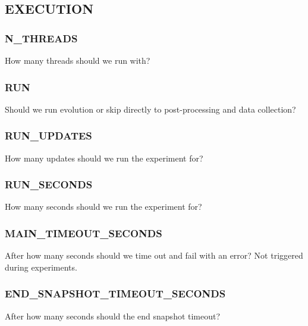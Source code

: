 \subsection{EXECUTION}


\subsubsection{N\_THREADS}


How many threads should we run with?

\subsubsection{RUN}


Should we run evolution or skip directly to post-processing and data collection?

\subsubsection{RUN\_UPDATES}


How many updates should we run the experiment for?

\subsubsection{RUN\_SECONDS}


How many seconds should we run the experiment for?

\subsubsection{MAIN\_TIMEOUT\_SECONDS}


After how many seconds should we time out and fail with an error?
Not triggered during experiments.

\subsubsection{END\_SNAPSHOT\_TIMEOUT\_SECONDS}


After how many seconds should the end snapshot timeout?

